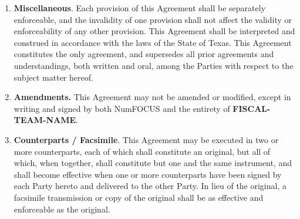 \documentclass[english,letterpaper,12pt]{article}
\newcommand{\signatories}{\textbf{SIGNATORIES}}
\newcommand{\fiscalteam}{\textbf{FISCAL-TEAM-NAME}}
\begin{document}
\begin{enumerate}[label=\arabic*.,ref=\S~\arabic*]
\begin{enumerate}[label=\alph*.,ref=\theenumi(\arabic*)]
\item \textbf{Additional Search Periods}. If the Parties cannot agree on a
  Successor to sponsor the Project, the \fiscalteam{} shall have an
  additional 60 days to find a Successor willing and able to sponsor the
  Project. Any subsequent search periods of any length shall only be granted at
  NumFOCUS' written permission.

\item \textbf{Transfer to a Successor}. If a Successor has Qualified, the
  balance of assets in the Project Fund, together with any other assets held or
  liabilities incurred by NumFOCUS in connection with the Project, shall be
  transferred to the Successor within thirty (30) days of the approval of the
  Successor in writing by both Parties or any extension thereof, subject to the
  approval of any third parties that may be required.

\item \textbf{Termination Without a Successor}. If no Successor is found,
  NumFOCUS may dispose of Project assets and liabilities in any manner
  consistent with applicable tax and charitable trust laws.

\item \textbf{\signatories{}' Right to Terminate.}  The \signatories{} hereby
  acknowledge that they will relinquish any rights to terminate separate from
  the \fiscalteam{} as of the Effective Date.

\end{enumerate}

\item \textbf{Miscellaneous}. Each provision of this Agreement shall be
  separately enforceable, and the invalidity of one provision shall not affect
  the validity or enforceability of any other provision.  This Agreement shall
  be interpreted and construed in accordance with the laws of the State of
  Texas. This Agreement constitutes the only agreement, and supersedes all
  prior agreements and understandings, both written and oral, among the Parties
  with respect to the subject matter hereof.

\item \textbf{Amendments. }This Agreement may not be amended or modified,
  except in writing and signed by both NumFOCUS and the entirety of
  \fiscalteam{}.

\item \textbf{Counterparts / Facsimile}. This Agreement may be executed in two
  or more counterparts, each of which shall constitute an original, but all of
  which, when together, shall constitute but one and the same instrument, and
  shall become effective when one or more counterparts have been signed by each
  Party hereto and delivered to the other Party.  In lieu of the original, a
  facsimile transmission or copy of the original shall be as effective and
  enforceable as the original.

\end{enumerate}
\end{document}
